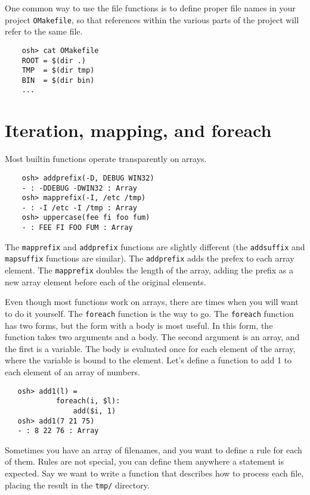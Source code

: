 One common way to use the file functions is to define proper file names in your project
\verb+OMakefile+, so that references within the various parts of the project will refer to the same
file.

\begin{verbatim}
    osh> cat OMakefile
    ROOT = $(dir .)
    TMP  = $(dir tmp)
    BIN  = $(dir bin)
    ...
\end{verbatim}

\section{Iteration, mapping, and foreach}

Most builtin functions operate transparently on arrays.

\begin{verbatim}
    osh> addprefix(-D, DEBUG WIN32)
    - : -DDEBUG -DWIN32 : Array
    osh> mapprefix(-I, /etc /tmp)
    - : -I /etc -I /tmp : Array
    osh> uppercase(fee fi foo fum)
    - : FEE FI FOO FUM : Array
\end{verbatim}

The \verb+mapprefix+ and \verb+addprefix+ functions are slightly different (the \verb+addsuffix+ and
\verb+mapsuffix+ functions are similar).  The \verb+addprefix+ adds the prefex to each array
element.  The \verb+mapprefix+ doubles the length of the array, adding the prefix as a new array
element before each of the original elements.

Even though most functions work on arrays, there are times when you will want to do it yourself.
The \verb+foreach+ function is the way to go.  The \verb+foreach+ function has two forms, but the
form with a body is most useful.  In this form, the function takes two arguments and a body.  The
second argument is an array, and the first is a variable.  The body is evaluated once for each
element of the array, where the variable is bound to the element.  Let's define a function to add 1
to each element of an array of numbers.

\begin{verbatim}
   osh> add1(l) =
            foreach(i, $l):
                add($i, 1)
   osh> add1(7 21 75)
   - : 8 22 76 : Array
\end{verbatim}

Sometimes you have an array of filenames, and you want to define a rule for each of them.  Rules are
not special, you can define them anywhere a statement is expected.  Say we want to write a function
that describes how to process each file, placing the result in the \verb+tmp/+ directory.

